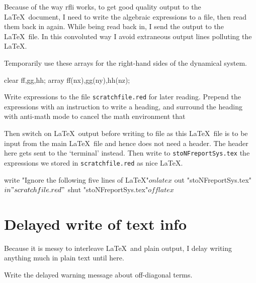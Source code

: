 \documentclass[11pt,a5paper]{article}
\begin{document}
Because of the way rfli works, to get good quality output to
the \LaTeX\ document, I need to write the algebraic
expressions to a file, then read them back in again. While
being read back in, I send the output to the \LaTeX\ file.
In this convoluted way I avoid extraneous output lines
polluting the \LaTeX. 

Temporarily use these arrays for the right-hand sides of the
dynamical system.
\begin{reduce}
clear ff,gg,hh;
array ff(nx),gg(ny),hh(nz);
\end{reduce}

Write expressions to the file \verb|scratchfile.red| for
later reading. Prepend the expressions with an instruction
to write a heading, and surround the heading with anti-math
mode to cancel the math environment that 

Then switch on \LaTeX\ output before writing to file as this
\LaTeX\ file is to be input from the main \LaTeX\ file and
hence does not need a header. The header here gets sent to
the `terminal' instead. Then write to
\verb|stoNFreportSys.tex| the expressions we stored in
\verb|scratchfile.red| as nice \LaTeX.
\begin{reduce}
write "Ignore the following five lines of LaTeX"$
on latex$
out "stoNFreportSys.tex"$
in "scratchfile.red"$
shut "stoNFreportSys.tex"$
off latex$
\end{reduce}



\section{Delayed write of text info}
\label{sec:dwti}

Because it is messy to interleave \LaTeX\ and plain output,
I delay writing anything much in plain text until here.

Write the delayed warning message about off-diagonal terms.
\end{document}
